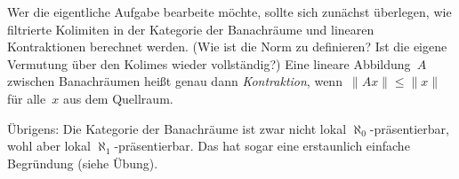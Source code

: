 \documentclass{uebblatt}
\begin{document}
Wer die eigentliche Aufgabe bearbeite möchte, sollte sich zunächst überlegen,
wie filtrierte Kolimiten in der Kategorie der Banachräume und linearen
Kontraktionen berechnet werden. (Wie ist die Norm zu definieren? Ist die eigene
Vermutung über den Kolimes wieder vollständig?) Eine lineare Abbildung~$A$ zwischen
Banachräumen heißt genau dann \emph{Kontraktion}, wenn~$\|Ax\| \leq \|x\|$ für
alle~$x$ aus dem Quellraum.

Übrigens: Die Kategorie der Banachräume ist zwar nicht lokal
$\aleph_0$-präsentierbar, wohl aber lokal $\aleph_1$-präsentierbar. Das hat
sogar eine erstaunlich einfache Begründung (siehe Übung).
\end{document}
